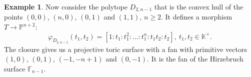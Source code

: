 \documentclass[a4paper,draft,reqno,12pt]{amsart}
\theoremstyle{definition}
\theoremstyle{definition}
\newtheorem{example}{Example}
\theoremstyle{remark}
\def\BK{{\mathbb K}}
\def\BF{{\mathbb F}}
\def\BK{{\mathbb K}}
\def\BP{{\mathbb P}}
\begin{document}
\begin{example}\label{hirzalgebraslow}
    Now consider the polytope $D_{2,n-1}$ that is the convex hull of the points $(0,0)$, $(n, 0)$, $(0, 1)$ and $(1,1)$, $n\geq2$. It defines a morphism $T\to\BP^{n+2}$:\begin{equation}\label{hirzmapping}
        \varphi_{D_{2,n-1}}(t_1,t_2)=[1:t_1:t_1^2:\dotsc:t_1^n:t_1t_2:t_2], \ t_1,t_2\in\BK^\times.
    \end{equation}
    The closure gives us a projective toric surface with a fan with primitive vectors $(1, 0)$, $(0, 1)$, $(-1,-n+1)$ and $(0, -1)$. It is the fan of the Hirzebruch surface $\BF_{n-1}$.

     \begin{figure}[h]
        \begin{minipage}{0.52\textwidth}
         \centering 
         \begin{tikzpicture}[x=0.75pt,y=0.75pt,yscale=-1,xscale=1]


\end{tikzpicture}
\end{minipage}
\end{figure}
\end{example}
\end{document}
